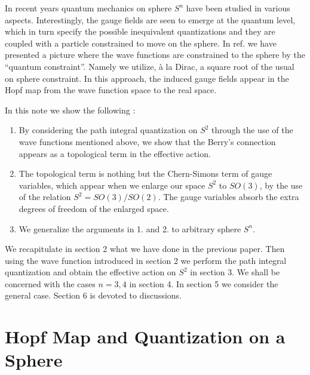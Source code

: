 \documentclass[12pt,a4paper]{article}
\begin{document}
In recent years quantum mechanics on sphere $S^{n}$ have been studied in
various aspects\cite{McMullan:1995wz}\cite{Ohnuki:1993cb}. Interestingly,
the gauge fields are seen to emerge at the quantum level, which in turn
specify the possible inequivalent quantizations and they are coupled with a
particle constrained to move on the sphere. In ref.\cite{Ikemori:1999yf} we
have presented a picture where the wave functions are constrained to the
sphere by the ``quantum constraint''. Namely we utilize, \`{a} la Dirac, a
square root of the usual on sphere constraint. In this approach, the induced
gauge fields appear in the Hopf map from the wave function space to the real
space.

In this note we show the following :

\begin{enumerate}
\item  By considering the path integral quantization on $S^{2}$ through the
use of the wave functions mentioned above, we show that the Berry's
connection appears as a topological term in the effective action.

\item  The topological term is nothing but the Chern-Simons term of gauge
variables, which appear when we enlarge our space $S^{2}$ to $SO(3)$, by the
use of the relation $S^{2}=SO(3)/SO(2)$. The gauge variables absorb the
extra degrees of freedom of the enlarged space.

\item  We generalize the arguments in 1. and 2. to arbitrary sphere $S^{n}$.
\end{enumerate}

We recapitulate in section 2 what we have done in the previous paper\cite
{Ikemori:1999yf}. Then using the wave function introduced in section 2 we
perform the path integral quantization and obtain the effective action on $%
S^{2}$ in section 3. We shall be concerned with the cases $n=3,4$ in section
4. In section 5 we consider the general case. Section 6 is devoted to
discussions.

\section{Hopf Map and Quantization on a Sphere}
\end{document}
